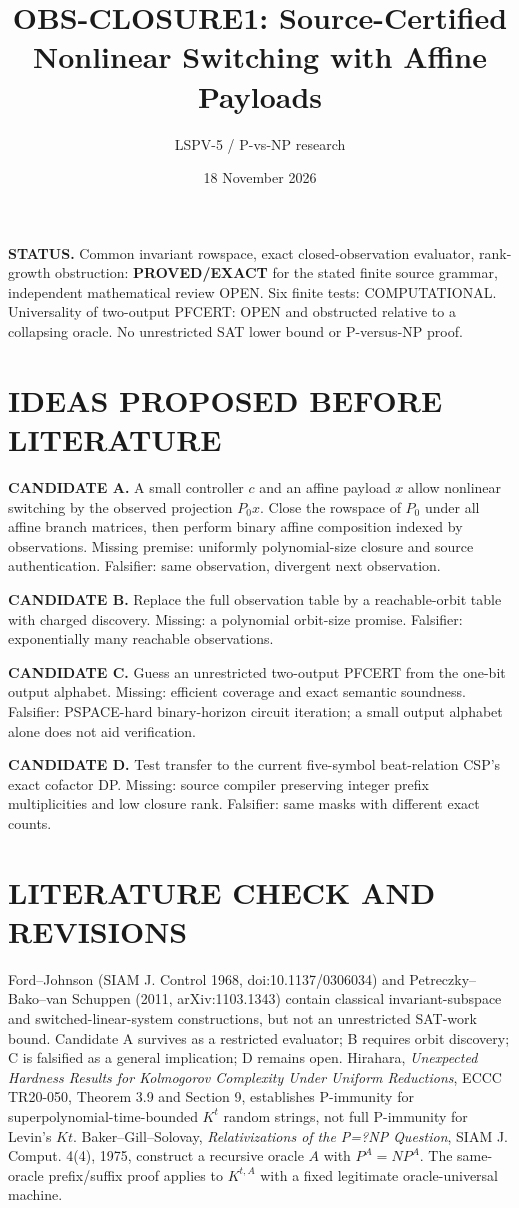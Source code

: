 \documentclass[11pt]{article}
\title{OBS-CLOSURE1: Source-Certified Nonlinear Switching with Affine Payloads}
\author{LSPV-5 / P-vs-NP research}
\date{18 November 2026}
\begin{document}
\maketitle
\noindent\textbf{STATUS.} Common invariant rowspace, exact closed-observation evaluator, rank-growth obstruction: \textbf{PROVED/EXACT} for the stated finite source grammar, independent mathematical review OPEN. Six finite tests: COMPUTATIONAL. Universality of two-output PFCERT: OPEN and obstructed relative to a collapsing oracle. No unrestricted SAT lower bound or P-versus-NP proof.
\section{IDEAS PROPOSED BEFORE LITERATURE}
\noindent\textbf{CANDIDATE A.} A small controller $c$ and an affine payload $x$ allow nonlinear switching by the observed projection $P_0x$. Close the rowspace of $P_0$ under all affine branch matrices, then perform binary affine composition indexed by observations. Missing premise: uniformly polynomial-size closure and source authentication. Falsifier: same observation, divergent next observation.
\par\noindent\textbf{CANDIDATE B.} Replace the full observation table by a reachable-orbit table with charged discovery. Missing: a polynomial orbit-size promise. Falsifier: exponentially many reachable observations.
\par\noindent\textbf{CANDIDATE C.} Guess an unrestricted two-output PFCERT from the one-bit output alphabet. Missing: efficient coverage and exact semantic soundness. Falsifier: PSPACE-hard binary-horizon circuit iteration; a small output alphabet alone does not aid verification.
\par\noindent\textbf{CANDIDATE D.} Test transfer to the current five-symbol beat-relation CSP's exact cofactor DP. Missing: source compiler preserving integer prefix multiplicities and low closure rank. Falsifier: same masks with different exact counts.
\section{LITERATURE CHECK AND REVISIONS}
Ford--Johnson (SIAM J. Control 1968, doi:10.1137/0306034) and Petreczky--Bako--van Schuppen (2011, arXiv:1103.1343) contain classical invariant-subspace and switched-linear-system constructions, but not an unrestricted SAT-work bound. Candidate A survives as a restricted evaluator; B requires orbit discovery; C is falsified as a general implication; D remains open. Hirahara, \emph{Unexpected Hardness Results for Kolmogorov Complexity Under Uniform Reductions}, ECCC TR20-050, Theorem 3.9 and Section 9, establishes P-immunity for superpolynomial-time-bounded $K^t$ random strings, not full P-immunity for Levin's $Kt$. Baker--Gill--Solovay, \emph{Relativizations of the P=?NP Question}, SIAM J. Comput. 4(4), 1975, construct a recursive oracle $A$ with $P^A=NP^A$. The same-oracle prefix/suffix proof applies to $K^{t,A}$ with a fixed legitimate oracle-universal machine.
\end{document}
